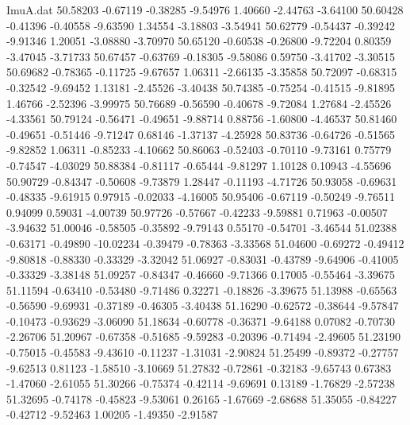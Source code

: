 \begin{filecontents}{ImuA.dat}
  50.58203   -0.67119   -0.38285   -9.54976    1.40660   -2.44763   -3.64100
  50.60428   -0.41396   -0.40558   -9.63590    1.34554   -3.18803   -3.54941
  50.62779   -0.54437   -0.39242   -9.91346    1.20051   -3.08880   -3.70970
  50.65120   -0.60538   -0.26800   -9.72204    0.80359   -3.47045   -3.71733
  50.67457   -0.63769   -0.18305   -9.58086    0.59750   -3.41702   -3.30515
  50.69682   -0.78365   -0.11725   -9.67657    1.06311   -2.66135   -3.35858
  50.72097   -0.68315   -0.32542   -9.69452    1.13181   -2.45526   -3.40438
  50.74385   -0.75254   -0.41515   -9.81895    1.46766   -2.52396   -3.99975
  50.76689   -0.56590   -0.40678   -9.72084    1.27684   -2.45526   -4.33561
  50.79124   -0.56471   -0.49651   -9.88714    0.88756   -1.60800   -4.46537
  50.81460   -0.49651   -0.51446   -9.71247    0.68146   -1.37137   -4.25928
  50.83736   -0.64726   -0.51565   -9.82852    1.06311   -0.85233   -4.10662
  50.86063   -0.52403   -0.70110   -9.73161    0.75779   -0.74547   -4.03029
  50.88384   -0.81117   -0.65444   -9.81297    1.10128    0.10943   -4.55696
  50.90729   -0.84347   -0.50608   -9.73879    1.28447   -0.11193   -4.71726
  50.93058   -0.69631   -0.48335   -9.61915    0.97915   -0.02033   -4.16005
  50.95406   -0.67119   -0.50249   -9.76511    0.94099    0.59031   -4.00739
  50.97726   -0.57667   -0.42233   -9.59881    0.71963   -0.00507   -3.94632
  51.00046   -0.58505   -0.35892   -9.79143    0.55170   -0.54701   -3.46544
  51.02388   -0.63171   -0.49890  -10.02234   -0.39479   -0.78363   -3.33568
  51.04600   -0.69272   -0.49412   -9.80818   -0.88330   -0.33329   -3.32042
  51.06927   -0.83031   -0.43789   -9.64906   -0.41005   -0.33329   -3.38148
  51.09257   -0.84347   -0.46660   -9.71366    0.17005   -0.55464   -3.39675
  51.11594   -0.63410   -0.53480   -9.71486    0.32271   -0.18826   -3.39675
  51.13988   -0.65563   -0.56590   -9.69931   -0.37189   -0.46305   -3.40438
  51.16290   -0.62572   -0.38644   -9.57847   -0.10473   -0.93629   -3.06090
  51.18634   -0.60778   -0.36371   -9.64188    0.07082   -0.70730   -2.26706
  51.20967   -0.67358   -0.51685   -9.59283   -0.20396   -0.71494   -2.49605
  51.23190   -0.75015   -0.45583   -9.43610   -0.11237   -1.31031   -2.90824
  51.25499   -0.89372   -0.27757   -9.62513    0.81123   -1.58510   -3.10669
  51.27832   -0.72861   -0.32183   -9.65743    0.67383   -1.47060   -2.61055
  51.30266   -0.75374   -0.42114   -9.69691    0.13189   -1.76829   -2.57238
  51.32695   -0.74178   -0.45823   -9.53061    0.26165   -1.67669   -2.68688
  51.35055   -0.84227   -0.42712   -9.52463    1.00205   -1.49350   -2.91587

\end{filecontents}

